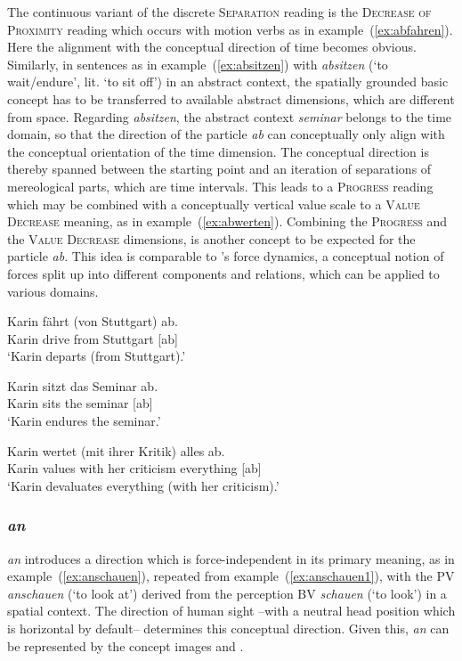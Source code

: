 \documentclass[output=paper]{langsci/langscibook}
\begin{document}
The continuous variant of the discrete \textsc{Separation} reading is
the \textsc{Decrease of Proximity} reading which occurs with motion
verbs as in example~(\ref{ex:abfahren}). Here the alignment with the
conceptual direction of time becomes obvious. Similarly, in sentences
as in example~(\ref{ex:absitzen}) with \textit{absitzen} (`to
wait/endure', lit. `to sit off') in an abstract context, the spatially
grounded basic concept has to be transferred to available abstract
dimensions, which are different from space. Regarding
\textit{absitzen}, the abstract context \textit{seminar} belongs to
the time domain, so that the direction of the particle \textit{ab} can
conceptually only align with the conceptual orientation of the time
dimension. The conceptual direction is thereby spanned between the
starting point and an iteration of separations of mereological parts,
which are time intervals. This leads to a \textsc{Progress} reading
which may be combined with a conceptually vertical value scale
\citep{Tversky:11} to a \textsc{Value Decrease} meaning, as in
example~(\ref{ex:abwerten}). Combining the \textsc{Progress} and the
\textsc{Value Decrease} dimensions,  is another
concept to be expected for the particle \textit{ab}. This idea is
comparable to \cite{Talmy:00}'s force dynamics, a conceptual notion of
forces split up into different components and relations, which can be
applied to various domains.

\ea\label{ex:abfahren}
\gll Karin fährt (von Stuttgart) ab.\\
Karin drive from Stuttgart [ab]\\
\glt `Karin departs (from Stuttgart).'
\z
  
\ea\label{ex:absitzen}
\gll Karin sitzt das Seminar ab.\\
Karin sits the seminar [ab]\\
\glt `Karin endures the seminar.'
\z
  
\ea\label{ex:abwerten}
\gll Karin wertet (mit ihrer Kritik) alles ab.\\
Karin values with her criticism everything [ab]\\
\glt `Karin devaluates everything (with her criticism).'
\z

\vspace{+1mm}
\subsubsection{\textit{an}}

\textit{an} introduces a direction which is force-independent in its
primary meaning, as in example~(\ref{ex:anschauen}), repeated from
example~(\ref{ex:anschauen1}), with the PV \textit{anschauen} (`to
look at') derived from the perception BV \textit{schauen} (`to look')
in a spatial context. The direction of human sight --with a neutral
head position which is horizontal by default-- determines this
conceptual direction. Given this, \textit{an} can be represented by
the concept images  and .
\end{document}
